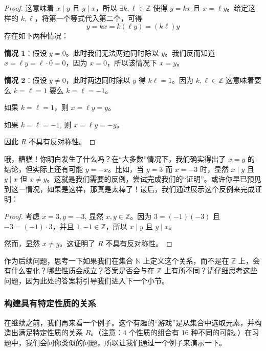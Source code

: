 \begin{example}
\begin{itemize}
\begin{proof}
            这意味着 $x \mid y$ 且 $y \mid x$，所以 $\exists k, \ell \in \mathbb{Z}$ 使得 $y = kx$ 且 $x = \ell y$。给定这样的 $k, \ell$，将第一个等式代入第二个，可得
            \[y = kx = k(\ell y) = (k \ell)y\]
            存在如下两种情况：

            \textbf{情况 1}：假设 $y=0$。此时我们无法两边同时除以 $y$。我们反而知道 $x = \ell y = \ell \cdot 0 = 0$，因为 $x=0$，所以该情况下 $x=y$。

            \textbf{情况 2}：假设 $y \ne 0$，此时两边同时除以 $y$ 得 $k \ell = 1$。因为 $k, \ell \in \mathbb{Z}$ 这意味着要么 $k = \ell = 1$ 要么 $k = \ell = -1$。

            如果 $k = \ell = 1$，则 $x = \ell y = y$。

            如果 $k = \ell = -1$, 则 $x = \ell y = -y$。

            因此 $R$ 不具有反对称性。
        \end{proof}
        哦，糟糕！你明白发生了什么吗？在``大多数''情况下，我们确实得出了 $x = y$ 的结论，但实际上还有可能 $y = -x$。比如，当 $y = 3$ 而 $x = -3$ 时，显然 $x \mid y$ 且 $y \mid x$ 但 $x \ne y$。这就是我们需要的反例，尝试完成我们的``证明''。或许你早已预见到这一情况，如果是这样，那真是太棒了！最后，我们通过展示这个反例来完成证明：
        \begin{proof}
            考虑 $x=3, y=-3$, 显然 $x, y \in \mathbb{Z}$。因为 $3 = (-1)(-3)$ 且 $-3 = (-1) \cdot 3$，并且 $1, -1 \in \mathbb{Z}$，所以 $x \mid y$ 且 $y \mid x$。

            然而，显然 $x \ne y$。这证明了 $R$ 不具有反对称性。
        \end{proof}
    \end{itemize}
\end{example}

作为后续问题，思考一下如果我们在集合 $\mathbb{N}$ 上定义这个关系，而不是在 $\mathbb{Z}$ 上，会有什么变化？哪些性质会成立？答案是否会与在 $\mathbb{Z}$ 上有所不同？请仔细思考这些问题，因为此处的答案将引导我们进入下一个小节。

\subsubsection*{构建具有特定性质的关系}

在继续之前，我们再来看一个例子。这个有趣的``游戏''是从集合中选取元素，并构造出满足特定性质的关系 $R$。（注意：$4$ 个性质的组合有 $16$ 种不同的可能。）在习题中，我们会问你类似的问题，所以让我们通过一个例子来演示一下。\\

